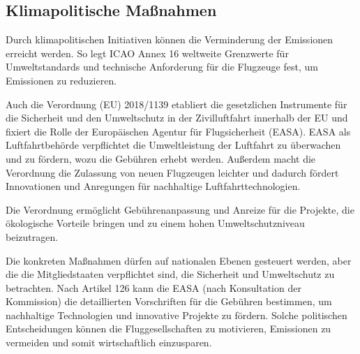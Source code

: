 \subsection{Klimapolitische Maßnahmen}
\label{s:Klimapolitische Maßnahmen}


Durch klimapolitischen Initiativen können die Verminderung der Emissionen erreicht werden. 
So legt ICAO Annex 16 weltweite Grenzwerte für Umweltstandards und technische Anforderung für die Flugzeuge fest, um Emissionen zu reduzieren.

Auch die Verordnung (EU) 2018/1139 etabliert die gesetzlichen Instrumente für die Sicherheit und den Umweltschutz in der Zivilluftfahrt innerhalb der EU 
und fixiert die Rolle der Europäischen Agentur für Flugsicherheit (EASA). EASA als Luftfahrtbehörde verpflichtet die 
Umweltleistung der Luftfahrt zu überwachen und zu fördern, wozu die Gebühren erhebt werden. Außerdem macht die Verordnung die Zulassung von
neuen Flugzeugen leichter und dadurch fördert Innovationen und Anregungen für nachhaltige Luftfahrttechnologien.

Die Verordnung ermöglicht Gebührenanpassung und Anreize für die Projekte, die ökologische Vorteile bringen und 
zu einem hohen Umweltschutzniveau beizutragen.

Die konkreten Maßnahmen dürfen auf nationalen Ebenen gesteuert werden, aber die die Mitgliedstaaten verpflichtet sind, 
die Sicherheit und Umweltschutz zu betrachten. Nach Artikel 126 kann die EASA (nach Konsultation der Kommission) die detaillierten 
Vorschriften für die Gebühren bestimmen, um nachhaltige Technologien und innovative Projekte zu fördern.
%
%
%
Solche politischen Entscheidungen können die Fluggesellschaften zu motivieren, Emissionen zu vermeiden und somit wirtschaftlich einzusparen.

